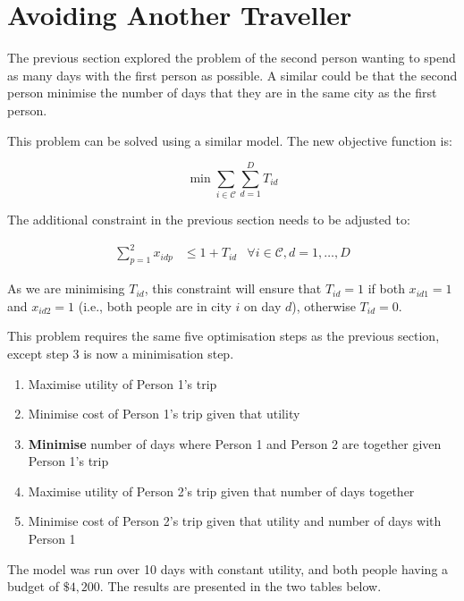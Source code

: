 \documentclass[12pt]{article}
\begin{document}
\section{Avoiding Another Traveller}

The previous section explored the problem of the second person wanting to spend as many days with the first person as possible. A similar could be that the second person minimise the number of days that they are in the same city as the first person.

This problem can be solved using a similar model. The new objective function is:

\begin{equation*}
	\min \sum_{i \in \mathcal{C}} \sum_{d = 1}^{D} T_{id}
\end{equation*}

The additional constraint in the previous section needs to be adjusted to:

\begin{align}
	\sum_{p = 1}^{2} x_{idp} & \leq 1 + T_{id} & \forall i \in \mathcal{C}, d = 1, \ldots, D
\end{align}

As we are minimising $T_{id}$, this constraint will ensure that $T_{id} = 1$ if both $x_{id1} = 1$ and $x_{id2} = 1$ (i.e., both people are in city $i$ on day $d$), otherwise $T_{id} = 0$.

This problem requires the same five optimisation steps as the previous section, except step 3 is now a minimisation step.

\begin{enumerate}
	\item Maximise utility of Person 1's trip
	\item Minimise cost of Person 1's trip given that utility
	\item \textbf{Minimise} number of days where Person 1 and Person 2 are together given Person 1's trip
	\item Maximise utility of Person 2's trip given that number of days together
	\item Minimise cost of Person 2's trip given that utility and number of days with Person 1
\end{enumerate}

The model was run over 10 days with constant utility, and both people having a budget of $\$4,200$. The results are presented in the two tables below.
\end{document}

